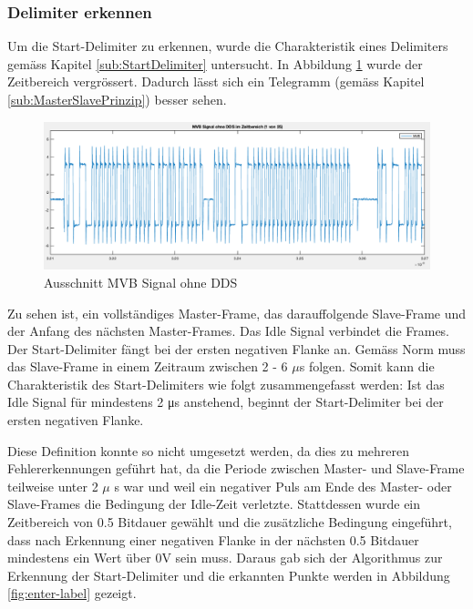 \subsubsection{Delimiter erkennen}
Um die Start-Delimiter zu erkennen, wurde die Charakteristik eines Delimiters gemäss Kapitel \ref{sub:StartDelimiter} untersucht. In Abbildung \ref{fig:AusschnittMvbOhneDds} wurde der Zeitbereich vergrössert. Dadurch lässt sich ein Telegramm (gemäss Kapitel \ref{sub:MasterSlavePrinzip}) besser sehen.

\begin{figure}[H]
    \centering
    \includegraphics[width=0.8\linewidth]{Figures/Chap3/Busauslastung/Ausschnitt_MVB_ohne_Delimiter.png}
    \caption{Ausschnitt MVB Signal ohne DDS}
    \label{fig:AusschnittMvbOhneDds}
\end{figure}

Zu sehen ist, ein vollständiges Master-Frame, das darauffolgende Slave-Frame und der Anfang des nächsten Master-Frames. Das Idle Signal verbindet die Frames. Der Start-Delimiter fängt bei der ersten negativen Flanke an. Gemäss Norm muss das Slave-Frame in einem Zeitraum zwischen 2 - 6 $\mu$s folgen. \cite{MVB_Frame_space} Somit kann die Charakteristik des Start-Delimiters wie folgt zusammengefasst werden: Ist das Idle Signal für mindestens 2 μs anstehend, beginnt der Start-Delimiter bei der ersten negativen Flanke.

Diese Definition konnte so nicht umgesetzt werden, da dies zu mehreren Fehlererkennungen geführt hat, da die Periode zwischen Master- und Slave-Frame teilweise unter 2 $\mu$ s war und weil ein negativer Puls am Ende des Master- oder Slave-Frames die Bedingung der Idle-Zeit verletzte. Stattdessen wurde ein Zeitbereich von 0.5 Bitdauer gewählt und die zusätzliche Bedingung eingeführt, dass nach Erkennung einer negativen Flanke in der nächsten 0.5 Bitdauer mindestens ein Wert über 0V sein muss. Daraus gab sich der Algorithmus zur Erkennung der Start-Delimiter und die erkannten Punkte werden in Abbildung \ref{fig:enter-label} gezeigt.

